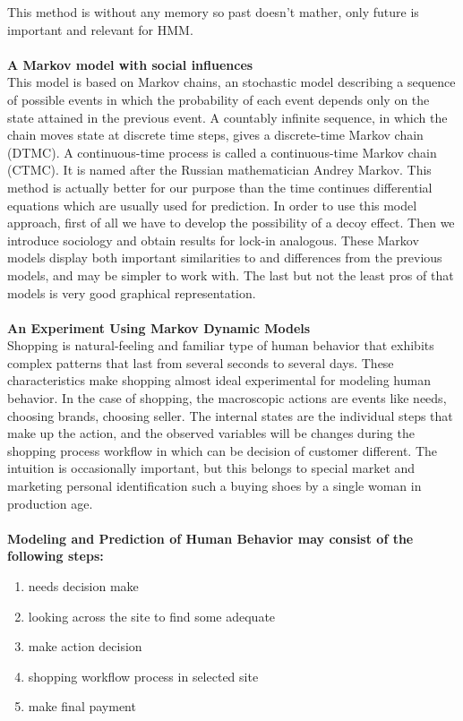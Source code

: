 This method is without any memory so past doesn't mather, only future is important and relevant for HMM.\\
\\
\textbf{A Markov model with social influences} \label{subsec:markov}\\
This model is based on Markov chains, an stochastic model describing a sequence of possible events in which the probability
of each event depends only on the state attained in the previous event.
A countably infinite sequence, in which the chain moves
state at discrete time steps, gives a discrete-time Markov chain (DTMC).
A continuous-time process is called a continuous-time Markov chain (CTMC).
It is named after the Russian mathematician Andrey Markov.
This method is actually better for our purpose than the time continues differential equations which are usually used for prediction.
In order to use this model approach, first of all we have to develop the possibility of a decoy effect.
Then we introduce sociology and obtain results for lock-in analogous.
These Markov models display both important similarities to and differences from the previous models, and may be simpler to work with.
The last but not the least pros of that models is very good graphical representation.\\
\\
\textbf{An Experiment Using Markov Dynamic Models} \label{subsec:markov_dynamic}\\
Shopping is natural-feeling and familiar type of human behavior that exhibits complex patterns that last from several seconds to several days.
These characteristics make shopping almost ideal experimental for modeling human behavior.
In the case of shopping, the macroscopic actions are events like needs, choosing brands, choosing seller.
The internal states are the individual steps that make up the action, and the observed variables will be changes during the shopping
process workflow in which can be decision of customer different.
The intuition is occasionally important, but this belongs to special market and marketing personal identification such a buying shoes by a single woman in production age.\\
\\
\textbf{Modeling and Prediction of Human Behavior may consist of the following steps:}\\
\begin{enumerate}
	\item needs decision make
	\item looking across the site to find some adequate
	\item make action decision
	\item shopping workflow process in selected site
	\item make final payment
\end{enumerate}
